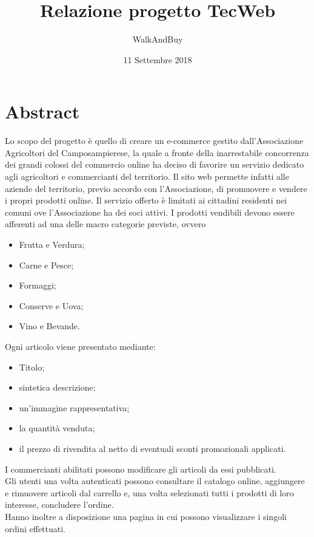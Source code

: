 



\title{\textbf{Relazione progetto TecWeb}}
\author{WalkAndBuy}

\date{11 Settembre 2018}




\makeFrontPage

\tableofcontents

\newpage

\section{Abstract}

Lo scopo del progetto è quello di creare un e-commerce gestito dall’Associazione Agricoltori del Camposampierese, la quale a fronte della inarrestabile concorrenza dei grandi colossi del commercio online ha deciso di favorire un servizio dedicato agli agricoltori e commercianti del territorio.
Il sito web permette infatti alle aziende del territorio, previo accordo con l’Associazione, di promuovere e vendere i propri prodotti online. 
Il servizio offerto è limitati ai cittadini residenti nei comuni ove l’Associazione ha dei soci attivi. 
I prodotti vendibili devono essere afferenti ad una delle macro categorie previste, ovvero 
\begin{itemize}
	\item Frutta e Verdura;
	\item Carne e Pesce;
	\item Formaggi;
	\item Conserve e Uova;
	\item Vino e Bevande.
\end{itemize}
Ogni articolo viene presentato mediante:
\begin{itemize}
	\item Titolo;
	\item sintetica descrizione;
	\item un’immagine rappresentativa;
	\item la quantità venduta;
	\item il prezzo di rivendita al netto di eventuali sconti promozionali applicati.
\end{itemize}

I commercianti abilitati possono modificare gli articoli da essi pubblicati.\\
Gli utenti una volta autenticati possono consultare il catalogo online, aggiungere e rimuovere articoli dal carrello e, una volta selezionati tutti i prodotti di loro interesse, concludere l’ordine. \\
Hanno inoltre a disposizione una pagina in cui possono visualizzare i singoli ordini effettuati.


